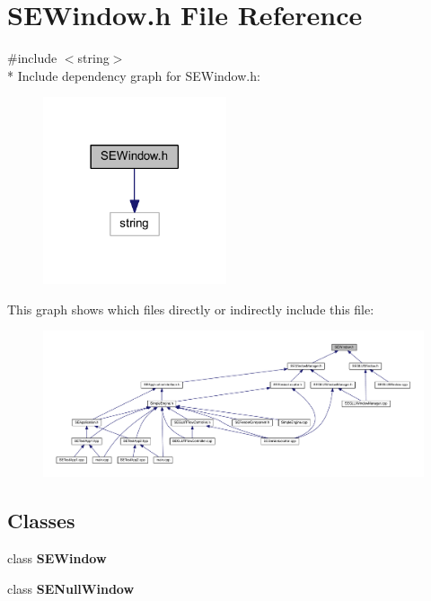 \section{S\+E\+Window.\+h File Reference}
\label{_s_e_window_8h}
{\ttfamily \#include $<$string$>$}\\*
Include dependency graph for S\+E\+Window.\+h\+:
\nopagebreak
\begin{figure}[H]
\begin{center}
\leavevmode
\includegraphics[width=153pt]{_s_e_window_8h__incl}
\end{center}
\end{figure}
This graph shows which files directly or indirectly include this file\+:
\nopagebreak
\begin{figure}[H]
\begin{center}
\leavevmode
\includegraphics[width=350pt]{_s_e_window_8h__dep__incl}
\end{center}
\end{figure}
\subsection*{Classes}
\begin{DoxyCompactItemize}
\item 
class {\bf S\+E\+Window}
\item 
class {\bf S\+E\+Null\+Window}
\end{DoxyCompactItemize}
